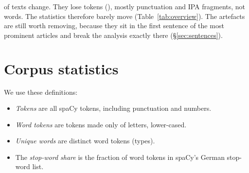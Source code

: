 \documentclass[11pt,a4paper]{article}
\begin{document}
\begin{table}[h]\centering\small
\begin{minipage}[t]{0.40\linewidth}\centering
\caption{Rule hits.}\label{tab:rules}
\resizebox{\linewidth}{!}{}
\end{minipage}\hfill
\begin{minipage}[t]{0.56\linewidth}\vspace{0pt}
\NChanged{} of \NTexts{} texts change. They lose \TokRemoved{} tokens (\TokRemovedPct), mostly punctuation and IPA fragments, not words. The statistics therefore barely move (Table~\ref{tab:overview}). The artefacts are still worth removing, because they sit in the first sentence of the most prominent articles and break the analysis exactly there (\S\ref{sec:sentences}).
\end{minipage}
\end{table}

\begin{table}[h]\centering\footnotesize
\caption{Cleaning examples.}

\end{table}

\section{Corpus statistics}\label{sec:stats}
We use these definitions:
\begin{itemize}
  \item \emph{Tokens} are all spaCy tokens, including punctuation and numbers.
  \item \emph{Word tokens} are tokens made only of letters, lower-cased.
  \item \emph{Unique words} are distinct word tokens (types).
  \item The \emph{stop-word share} is the fraction of word tokens in spaCy's German stop-word list.
\end{itemize}

\begin{table}[h]\centering\small
\caption{Corpus overview, raw and cleaned.}\label{tab:overview}

\end{table}

\begin{table}[h]\centering\small
\caption{Ten most frequent words, all and without stop words.}\label{tab:top}

\end{table}
\end{document}
